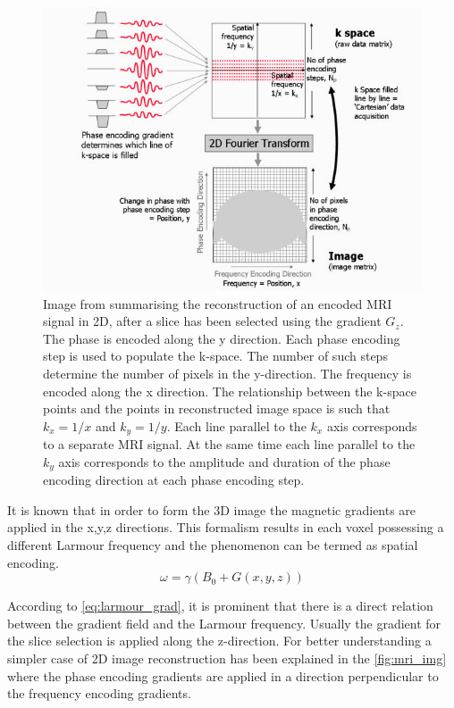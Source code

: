 \documentclass[msthesis.tex]{subfiles}
\begin{document}
\begin{figure}
    \centering
    \includegraphics[width=\textwidth]{images/img_reconstruction.jpg}
    \caption{Image from \cite{MRIrecon} summarising the reconstruction of an encoded \gls{MRI} signal in 2D, after a slice has been selected using the gradient $G_z$. The phase is encoded along the y direction. Each phase encoding step is used to populate the k-space. The number of such steps determine the number of pixels in the y-direction. The frequency is encoded along the x direction. The relationship between the k-space points and the points in reconstructed image space is such that $k_x =1/x$ and $k_y= 1/y$. Each line parallel to the $k_x$ axis corresponds to a separate MRI signal. At the same time each line parallel to the $k_y$ axis corresponds to the amplitude and duration of the phase encoding direction at each phase encoding step.}
    \label{fig:mri_img}
\end{figure}

It is known that in order to form the 3D image the magnetic gradients are applied in the x,y,z directions. This formalism results in each voxel possessing a different Larmour frequency and the phenomenon can be termed as spatial encoding. 
\begin{equation}
        \label{eq:larmour_grad}
          \omega = \gamma(B_0 + G(x, y, z))
     \end{equation}
       
According to \autoref{eq:larmour_grad}, it is prominent that there is a direct relation between the gradient field and the Larmour frequency. Usually the gradient for the slice selection is applied along the z-direction. For better understanding a simpler case of 2D image reconstruction has been explained in the \autoref{fig:mri_img} where the phase encoding gradients are applied in a direction perpendicular to the frequency encoding gradients.
\end{document}
